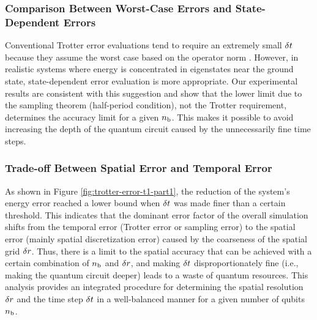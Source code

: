 \documentclass[jctc-draft.tex]{subfiles}
\begin{document}
\subsubsection{Comparison Between Worst-Case Errors and State-Dependent Errors}
Conventional Trotter error evaluations tend to require an extremely small
$\delta t$ because they assume the worst case based on the operator norm
\cite{Burgarth2024.PhysRevResearch.6.043155}. However, in realistic systems
where energy is concentrated in eigenstates near the ground state,
state-dependent error evaluation is more appropriate. Our experimental results
are consistent with this suggestion and show that the lower limit due to the
sampling theorem (half-period condition), not the Trotter requirement,
determines the accuracy limit for a given $n_{\mathrm{b}}$. This makes it possible to avoid
increasing the depth of the quantum circuit caused by the unnecessarily fine
time steps.

\subsubsection{Trade-off Between Spatial Error and Temporal Error}
As shown in Figure \ref{fig:trotter-error-t1-part1}, the reduction of the
system's energy error reached a lower bound when $\delta t$ was made finer than a
certain threshold. This indicates that the dominant error factor of the overall
simulation shifts from the temporal error (Trotter error or sampling error) to
the spatial error (mainly spatial discretization error) caused by the coarseness
of the spatial grid $\delta r$. Thus, there is a limit to the spatial accuracy
that can be achieved with a certain combination of $n_{\mathrm{b}}$ and $\delta r$, and
making $\delta t$ disproportionately fine (i.e., making the quantum circuit
deeper) leads to a waste of quantum resources. This analysis provides an
integrated procedure for determining the spatial resolution $\delta r$ and the
time step $\delta t$ in a well-balanced manner for a given number of qubits
$n_{\mathrm{b}}$.


\clearpage
\end{document}

